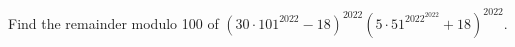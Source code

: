 Find the remainder modulo 100 of $(30\cdot101^{2022}-18)^{2022}(5\cdot51^{2022^{2022}}+18)^{2022}$.
